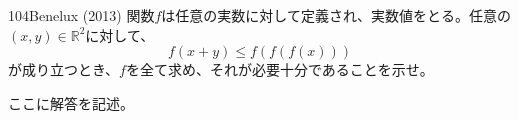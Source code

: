 \begin{thm}{104}{}{Benelux (2013)}
 関数$f$は任意の実数に対して定義され、実数値をとる。任意の$(x,y)\in\mathbb{R}^2$に対して、
 \[ f(x+y) \leq f\left(f\left(f(x)\right)\right) \]
 が成り立つとき、$f$を全て求め、それが必要十分であることを示せ。
\end{thm}

ここに解答を記述。
